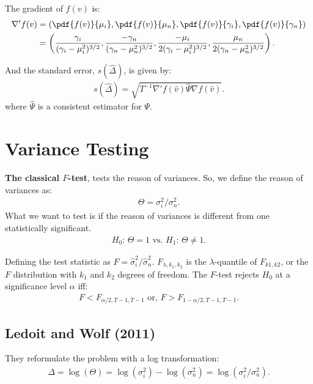 \documentclass[12pt,oneside,a4paper]{article}
\begin{document}
The gradient of $f(v)$ is:
\begin{align*}
\nabla' f(v) &=
\left( 
\pdf{f(v)}{\mu_{i}},
\pdf{f(v)}{\mu_{n}},
\pdf{f(v)}{\gamma_{i}},
\pdf{f(v)}{\gamma_{n}}
\right)
\\ &=
\left( 
\frac{ \gamma_{i}}{(\gamma_{i} - \mu_{i}^2)^{3/2}},
\frac{-\gamma_{n}}{(\gamma_{n} - \mu_{n}^2)^{3/2}}, 
\frac{-\mu_{i}}{2(\gamma_{i} - \mu_{i}^2)^{3/2}},  
\frac{ \mu_{n}}{2(\gamma_{n} - \mu_{n}^2)^{3/2}}
\right).
\end{align*}

And the standard error, $s(\hat{\Delta})$, is given by:
\begin{align*}
s(\hat{\Delta}) = \sqrt{T^{-1} \nabla'f(\hat{v}) \hat{\Psi} \nabla f(\hat{v})}.
\end{align*}
where $\hat{\Psi}$ is a consistent estimator for $\Psi$.

\clearpage 
\section{Variance Testing}
\cite{lw2011}

\textbf{The classical $F$-test}, tests the reason of variances.
So, we define the reason of variances as:
\begin{align}
	\Theta=\sigma^2_{i}/\sigma^2_{n}.
\end{align}
What we want to test is if the reason of variances is different from one statistically significant.
\begin{align*}
	H_{0}: \,\Theta = 1
	\text{ vs. }
	H_{1}: \,\Theta \neq 1.
\end{align*}

Defining the test statistic as $F=\hat{\sigma}^2_{i}/\hat{\sigma}^2_{n}$.
$F_{\lambda, k_{1}, k_{2}}$ is the $\lambda$-quantile of $F_{k1, k2}$, or the $F$ distribution with $k_{1}$ and $k_{2}$ degrees of freedom.
The $F$-test rejects $H_{0}$ at a significance level $\alpha$ iff:
\begin{align*}
	F < F_{\alpha/2, T-1, T-1} 
	\text{ or, }
	F > F_{1-\alpha/2, T-1, T-1}.
\end{align*}

\subsection{Ledoit and Wolf (2011)}

They reformulate the problem with a log transformation: 
\begin{align}
\Delta = \log(\Theta) =
\log(\sigma_{i}^{2}) - \log(\sigma_{n}^{2})  =
\log(\sigma_{i}^{2}/\sigma_{n}^{2}).
\end{align}
\end{document}

